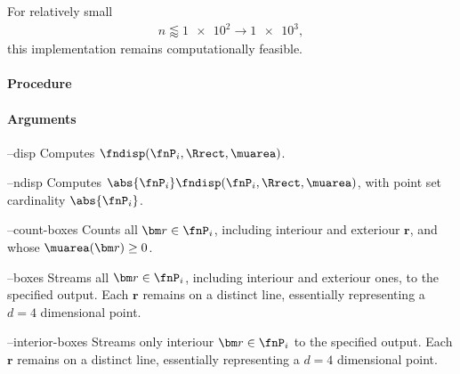 For relatively small 
\begin{align*}
  n \lessapprox \num{1e2} \rightarrow \num{1e3},
\end{align*}
this implementation remains computationally feasible.

\paragraph{Procedure}

\begin{synopsis}
\end{synopsis}

\paragraph{Arguments}

\procarginseq{\ptseqsize}

\procargout

\begin{procarg}{--disp}
  Computes $\fndisp(\fnP_i, \Rrect, \muarea)$.
\end{procarg}

\begin{procarg}{--ndisp}
  Computes $\abs{\fnP_i} \fndisp(\fnP_i, \Rrect, \muarea)$, with point set cardinality $\abs{\fnP_i}$.
\end{procarg}

\begin{procarg}{--count-boxes}
  Counts all $\bm r \in \fnP_i$, including interiour and exteriour $\bm r$, and whose $\muarea(\bm r) \geq 0$.
\end{procarg}

\begin{procarg}{--boxes}
  Streams all $\bm r \in \fnP_i$, including interiour and exteriour ones, to the specified output. Each $\bm r$ remains on a distinct line, essentially representing a $d=4$ dimensional point.
\end{procarg}

\begin{procarg}{--interior-boxes}
  Streams only interiour $\bm r \in \fnP_i$ to the specified output. Each $\bm r$ remains on a distinct line, essentially representing a $d=4$ dimensional point.
\end{procarg}

